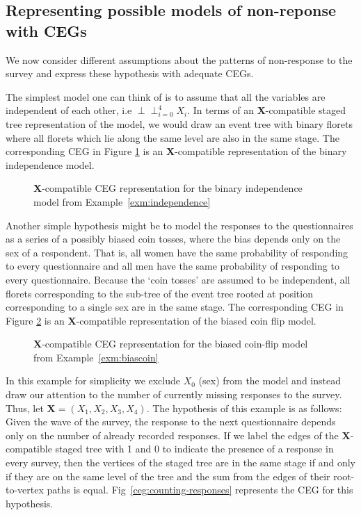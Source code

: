 \documentclass[runningheads]{llncs}
\newcommand{\ind}{\perp\!\!\!\!\perp}
\begin{document}
\subsection{Representing possible models of non-reponse with CEGs}\label{subsec:dropouts-hypothesis}
We now consider different assumptions about the patterns of non-response to the survey and express these hypothesis with adequate CEGs. 
\begin{example}[Independence]
\label{exm:independence}
The simplest model one can think of is to assume that all the variables are independent of each other, i.e $\ind_{i=0}^{4}X_i$. In terms of an $\boldsymbol{X}$-compatible staged tree representation of the model, we would draw an event tree with binary florets where all florets which lie along the same level are also in the same stage. The corresponding CEG in Figure \ref{ceg:indep} is an $\boldsymbol{X}$-compatible representation of the binary independence model.
\end{example}
\begin{figure}
\centering

\caption{$\boldsymbol{X}$-compatible CEG representation for the binary independence model from Example~\ref{exm:independence}}
\label{ceg:indep}
\end{figure}
\begin{example}
\label{exm:biascoin}
Another simple hypothesis might be to model the responses to the questionnaires as a series of a possibly biased coin tosses, where the bias depends only on the sex of a respondent. That is, all women have the same probability of responding to every questionnaire and all men have the same probability of responding to every questionnaire. Because the `coin tosses' are assumed to be independent, all florets corresponding to the sub-tree of the event tree rooted at position corresponding to a single sex are in the same stage. The corresponding CEG in Figure \ref{ceg:biascoin} is an $\boldsymbol{X}$-compatible representation of the biased coin flip model.
\end{example}
\begin{figure}
\centering

\caption{$\boldsymbol{X}$-compatible CEG representation for the biased coin-flip model from Example~\ref{exm:biascoin}}
\label{ceg:biascoin}
\end{figure}
\begin{example}
\label{exm:counting-responses}
In this example for simplicity we exclude $X_0$ (sex) from the model and instead draw our attention to the number of currently missing responses to the survey. Thus, let $\boldsymbol{X} = (X_1, X_2, X_3, X_4)$. The hypothesis of this example is as follows: Given the wave of the survey, the response to the next questionnaire depends only on the number of already recorded responses. 
If we label the edges of the $\boldsymbol{X}$-compatible staged tree with 1 and 0 to indicate the presence of a response in every survey, then the vertices of the staged tree are in the same stage if and only if they are on the same level of the tree and the sum from the edges of their root-to-vertex paths is equal. Fig~\ref{ceg:counting-responses} represents the CEG for this hypothesis.
\end{example}
\end{document}
